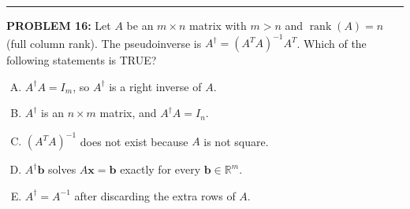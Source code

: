 \documentclass[12pt]{amsart}
\newcommand{\divider}{
  \vspace{-1em} %
  \noindent
  \raisebox{-0.15ex}{\textbullet}%
  \hspace{0.5em}%
  \rule[0.5ex]{0.95\textwidth}{1.0pt}%
  \hspace{0.5em}%
  \raisebox{-0.15ex}{\textbullet}%
  \vspace{0em} %
}
\begin{document}
%
\divider




{\bf PROBLEM 16:}
%
Let $A$ be an $m \times n$ matrix with $m > n$ and $\operatorname{rank}(A) = n$ (full column rank). The pseudoinverse is $A^\dagger = (A^TA)^{-1}A^T$. Which of the following statements is TRUE?

\begin{enumerate}[(A)]
\item $A^\dagger A = I_m$, so $A^\dagger$ is a right inverse of $A$.
\item $A^\dagger$ is an $n \times m$ matrix, and $A^\dagger A = I_n$.
\item $(A^TA)^{-1}$ does not exist because $A$ is not square.
\item $A^\dagger \mathbf{b}$ solves $A\mathbf{x} = \mathbf{b}$ exactly for every $\mathbf{b} \in \mathbb{R}^m$.
\item $A^\dagger = A^{-1}$ after discarding the extra rows of $A$.
\end{enumerate}
\end{document}
